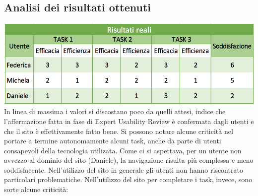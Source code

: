 \documentclass[12pt,a4paper]{report}
\begin{document}
  \subsection{Analisi dei risultati ottenuti}
  \includegraphics[width=1\textwidth]{"Project Management Sources/RisultatiReali"}\vspace{5mm}
  In linea di massima i valori si discostano poco da quelli attesi, indice che l'affermazione fatta in fase di Expert Usability Review è confermata dagli utenti e che il sito è effettivamente fatto bene. Si possono notare alcune criticità nel portare a termine autonomamente alcuni task, anche da parte di utenti consapevoli della tecnologia utilizata. Come ci si aspettava, per un utente non avvezzo al dominio del sito (Daniele), la navigazione risulta più complessa  e meno soddisfacente.\vspace{5mm}
  Nell'utilizzo del sito in generale gli utenti non hanno riscontrato particolari problematiche. Nell'utilizzo del sito per completare i task, invece, sono sorte alcune criticità:
\end{document}
